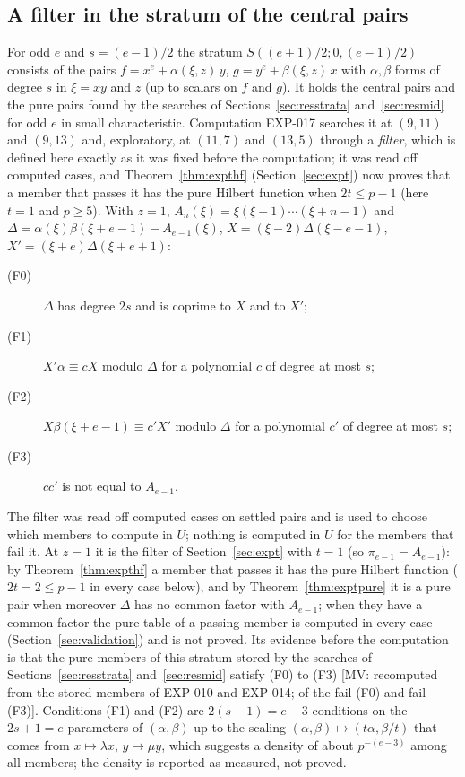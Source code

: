 \documentclass[11pt]{article}
\theoremstyle{definition}
\theoremstyle{remark}
\newcommand{\EXP}[1]{\mbox{EXP-#1}}
\begin{document}
\subsection{A filter in the stratum of the central pairs}
\label{sec:resfilter}

For odd $e$ and $s=(e-1)/2$ the stratum $S((e+1)/2;0,(e-1)/2)$ consists of the pairs $f=x^e+\alpha(\xi,z)\,y$, $g=y^e+\beta(\xi,z)\,x$ with $\alpha,\beta$ forms of degree $s$ in $\xi=xy$ and $z$ (up to scalars on $f$ and $g$). It holds the central pairs and the pure pairs found by the searches of Sections~\ref{sec:resstrata} and~\ref{sec:resmid} for odd $e$ in small characteristic. Computation \EXP{017} searches it at $(9,11)$ and $(9,13)$ and, exploratory, at $(11,7)$ and $(13,5)$ through a \emph{filter}, which is defined here exactly as it was fixed before the computation; it was read off computed cases, and Theorem~\ref{thm:expthf} (Section~\ref{sec:expt}) now proves that a member that passes it has the pure Hilbert function when $2t\le p-1$ (here $t=1$ and $p\ge5$). With $z=1$, $A_n(\xi)=\xi(\xi+1)\cdots(\xi+n-1)$ and $\Delta=\alpha(\xi)\beta(\xi+e-1)-A_{e-1}(\xi)$, $X=(\xi-2)\Delta(\xi-e-1)$, $X'=(\xi+e)\Delta(\xi+e+1)$:
\begin{description}
\item[(F0)] $\Delta$ has degree $2s$ and is coprime to $X$ and to $X'$;
\item[(F1)] $X'\alpha\equiv cX$ modulo $\Delta$ for a polynomial $c$ of degree at most $s$;
\item[(F2)] $X\beta(\xi+e-1)\equiv c'X'$ modulo $\Delta$ for a polynomial $c'$ of degree at most $s$;
\item[(F3)] $cc'$ is not equal to $A_{e-1}$.
\end{description}
The filter was read off computed cases on settled pairs and is used to choose which members to compute in $U$; nothing is computed in $U$ for the members that fail it. At $z=1$ it is the filter of Section~\ref{sec:expt} with $t=1$ (so $\pi_{e-1}=A_{e-1}$): by Theorem~\ref{thm:expthf} a member that passes it has the pure Hilbert function ($2t=2\le p-1$ in every case below), and by Theorem~\ref{thm:exptpure} it is a pure pair when moreover $\Delta$ has no common factor with $A_{e-1}$; when they have a common factor the pure table of a passing member is computed in every case (Section~\ref{sec:validation}) and is not proved. Its evidence before the computation is that the \nstmPure{} pure members of this stratum stored by the searches of Sections~\ref{sec:resstrata} and~\ref{sec:resmid} satisfy (F0) to (F3) [MV: recomputed from the stored members of \EXP{010} and \EXP{014}; \nstmFailFZero{} of the \nstmOther{} fail (F0) and \nstmFailFThree{} fail (F3)]. Conditions (F1) and (F2) are $2(s-1)=e-3$ conditions on the $2s+1=e$ parameters of $(\alpha,\beta)$ up to the scaling $(\alpha,\beta)\mapsto(t\alpha,\beta/t)$ that comes from $x\mapsto\lambda x$, $y\mapsto\mu y$, which suggests a density of about $p^{-(e-3)}$ among all members; the density is reported as measured, not proved.
\end{document}
